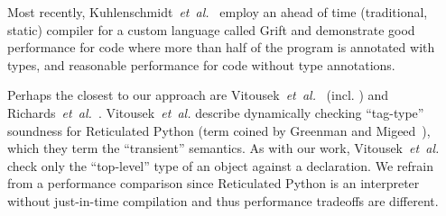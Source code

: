 
Most recently, Kuhlenschmidt~\textit{et~al.}~\cite{Kuhlenschmidt:2018:preprint} employ an
ahead of time (\ie traditional, static) compiler for a custom
language called Grift and demonstrate good performance for code where more than
half of the program is annotated with types, and reasonable
performance for code without type annotations.

Perhaps the closest to our approach are
Vitousek~\textit{et~al.}~\cite{reticPython2014} (incl. \citep{Vitousek2017,Greenman2018})
and Richards~\textit{et~al.}~\cite{Richards2017}.
Vitousek~\textit{et~al.} describe dynamically checking ``tag-type''
soundness for Reticulated Python (term coined by Greenman
and Migeed~\cite{Greenman2018}), which they term the ``transient'' semantics.
As with our work, Vitousek~\textit{et~al.} check only the ``top-level'' type of an
object against a declaration.
%
We refrain from a performance comparison since
Reticulated Python is an interpreter without just-in-time compilation
and thus performance tradeoffs are different.


